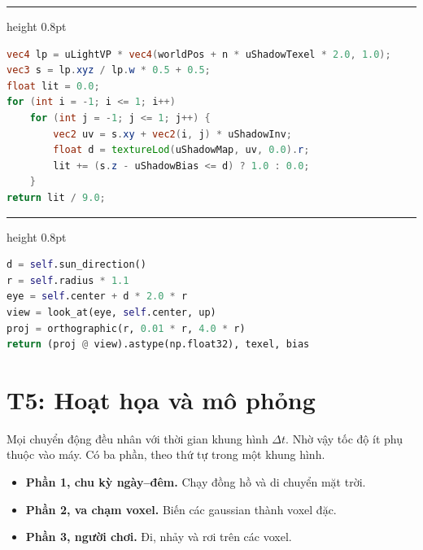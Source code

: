 \documentclass[9pt,twocolumn,a4paper]{extarticle}
\newenvironment{codebox}{\par\vspace{5pt}\noindent\begin{minipage}{\columnwidth}\hrule height 0.8pt\vspace{2pt}}{\end{minipage}\par\vspace{5pt}\noindent\ignorespaces}
\newcommand{\code}[1]{\texttt{#1}}
\begin{document}
\begin{codebox}
\begin{lstlisting}[language=GLSL,caption={\code{render/shaders/splat\_prep.vert}, \code{shadowFactor}: PCF $3\times3$},label={lst:pcf}]
vec4 lp = uLightVP * vec4(worldPos + n * uShadowTexel * 2.0, 1.0);
vec3 s = lp.xyz / lp.w * 0.5 + 0.5;
float lit = 0.0;
for (int i = -1; i <= 1; i++)
    for (int j = -1; j <= 1; j++) {
        vec2 uv = s.xy + vec2(i, j) * uShadowInv;
        float d = textureLod(uShadowMap, uv, 0.0).r;
        lit += (s.z - uShadowBias <= d) ? 1.0 : 0.0;
    }
return lit / 9.0;
\end{lstlisting}
\end{codebox}

\begin{codebox}
\begin{lstlisting}[language=Python,caption={\code{core/lighting.py}, \code{Lighting.shadow\_setup}: ma trận nhìn từ mặt trời},label={lst:shadowsetup}]
d = self.sun_direction()
r = self.radius * 1.1
eye = self.center + d * 2.0 * r
view = look_at(eye, self.center, up)
proj = orthographic(r, 0.01 * r, 4.0 * r)
return (proj @ view).astype(np.float32), texel, bias
\end{lstlisting}
\end{codebox}

\section{T5: Hoạt họa và mô phỏng}
\label{chap:t5}
Mọi chuyển động đều nhân với thời gian khung hình $\Delta t$. Nhờ vậy tốc độ ít phụ thuộc vào máy. Có ba phần, theo thứ tự trong một khung hình.
\begin{itemize}\itemsep0pt
\item \textbf{Phần 1, chu kỳ ngày--đêm.} Chạy đồng hồ và di chuyển mặt trời.
\item \textbf{Phần 2, va chạm voxel.} Biến các gaussian thành voxel đặc.
\item \textbf{Phần 3, người chơi.} Đi, nhảy và rơi trên các voxel.
\end{itemize}
\end{document}
